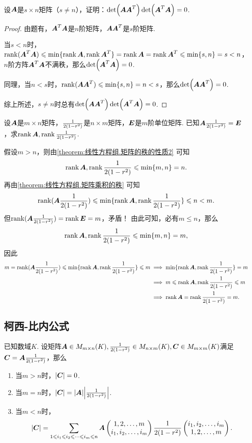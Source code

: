 \begin{example}
设\(\A\)是\(s \times n\)矩阵（\(s \neq n\)），证明：\(\det(\A \A^T) \det(\A^T \A) = 0\).
\begin{proof}
由题有，\(\A^T \A\)是\(n\)阶矩阵，\(\A \A^T\)是\(s\)阶矩阵.

当\(s < n\)时，\(\rank(\A^T \A) \leqslant \min\{ \rank\A, \rank\A^T \} = \rank\A = \rank\A^T \leqslant \min\{s,n\} = s < n\)，\(n\)阶方阵\(\A^T \A\)不满秩，那么\(\det(\A^T \A) = 0\).

同理，当\(n < s\)时，\(\rank(\A \A^T) \leqslant \min\{s,n\} = n < s\)，那么\(\det(\A \A^T) = 0\).

综上所述，\(s \neq n\)时总有\(\det(\A \A^T) \det(\A^T \A) = 0\).
\end{proof}
\end{example}

\begin{example}
设\(\A\)是\(m \times n\)矩阵，\(\B\)是\(n \times m\)矩阵，\(\E\)是\(m\)阶单位矩阵.
已知\(\A\B = \E\)，求\(\rank\A,\rank\B\).
\begin{solution}
假设\(m > n\)，则由\cref{theorem:线性方程组.矩阵的秩的性质2} 可知\[
\rank\A,\rank\B \leqslant \min\{m,n\} = n.
\]再由\cref{theorem:线性方程组.矩阵乘积的秩} 可知\[
\rank(\A\B) \leqslant \min\{\rank\A,\rank\B\} \leqslant n < m.
\]但\(\rank(\A\B) = \rank\E = m\)，矛盾！
由此可知，必有\(m \leqslant n\)，那么\[
\rank\A,\rank\B \leqslant \min\{m,n\} = m,
\]因此\begin{align*}
m = \rank(\A\B) \leqslant \min\{\rank\A,\rank\B\} \leqslant m
&\implies
\min\{\rank\A,\rank\B\} = m \\
&\implies
m \leqslant \rank\A,\rank\B \leqslant m \\
&\implies \rank\A=\rank\B=m.
\end{align*}
\end{solution}
\end{example}

\subsection{柯西-比内公式}
\begin{theorem}
已知数域\(K\).
设矩阵\(\A \in M_{m \times n}(K),
\B \in M_{n \times m}(K),
\C \in M_{m \times m}(K)\)满足\(\C = \A \B\)，那么\begin{enumerate}
\item 当\(m > n\)时，\(\abs{\C} = 0\).
\item 当\(m = n\)时，\(\abs{\C} = \abs{\A} \abs{\B}\).
\item 当\(m < n\)时，\begin{equation}\label{equation:线性方程组.柯西-比内公式}
\abs{\C} = \sum\limits_{1 \leqslant i_1 \leqslant i_2 \leqslant \dotsb \leqslant i_m \leqslant n} \MatrixMinor\A{
1,2,\dotsc,m \\
i_1,i_2,\dotsc,i_m
}
\MatrixMinor\B{
i_1,i_2,\dotsc,i_m \\
1,2,\dotsc,m
}.
\end{equation}
\end{enumerate}
\end{theorem}

